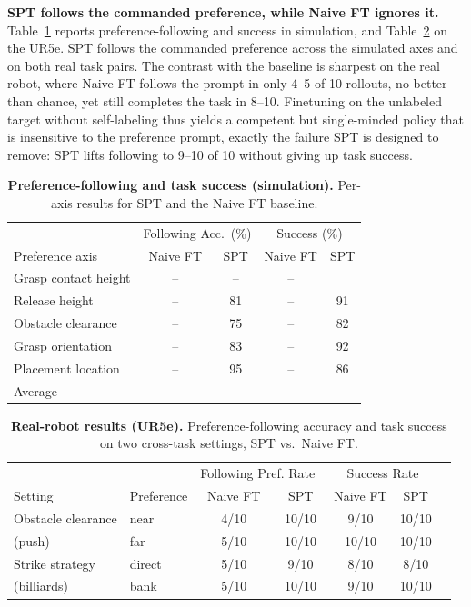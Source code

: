 \documentclass{article}
\begin{document}
\textbf{SPT follows the commanded preference, while Naive FT ignores it.}
Table~\ref{tab:sim_main} reports preference-following and success in simulation,
and Table~\ref{tab:real_main} on the UR5e. SPT follows the commanded preference
across the simulated axes and on both real task pairs. The contrast with the
baseline is sharpest on the real robot, where Naive FT follows the prompt in only
4--5 of 10 rollouts, no better than chance, yet still completes the task in 8--10.
Finetuning on the unlabeled target without self-labeling thus yields a competent
but single-minded policy that is insensitive to the preference prompt, exactly the
failure SPT is designed to remove: SPT lifts following to 9--10 of 10 without
giving up task success. 

\begin{table}[t]
  \centering
  \small
  \caption{\textbf{Preference-following and task success (simulation).} Per-axis
  results for SPT and the Naive FT baseline.}
  \label{tab:sim_main}
  \begin{tabular}{lcccc}
    \hline
    & \multicolumn{2}{c}{Following Acc.\ (\%)} & \multicolumn{2}{c}{Success (\%)} \\
    Preference axis & Naive FT & SPT & Naive FT & SPT \\
    \hline
    Grasp contact height & -- & -- & -- &  \\
    Release height       & -- & 81 & -- & 91 \\
    Obstacle clearance   & -- & 75 & -- & 82 \\
    Grasp orientation    & -- & 83 & -- & 92 \\
    Placement location   & -- & 95 & -- & 86 \\
    \hline
    Average              & -- & \textbf{--} & -- & -- \\
    \hline
  \end{tabular}
\end{table}

\begin{table}[t]
  \centering
  \small
  \caption{\textbf{Real-robot results (UR5e).} Preference-following accuracy and
  task success on two cross-task settings, SPT vs.\ Naive FT. }
  \label{tab:real_main}
  \begin{tabular}{llccccc}
    \hline
    & & \multicolumn{2}{c}{Following Pref. Rate\ } & \multicolumn{2}{c}{Success Rate} \\
    Setting & Preference & Naive FT & SPT & Naive FT & SPT \\
    \hline
    Obstacle clearance & near    & 4/10 & 10/10 & 9/10 & 10/10 \\
    (push)             & far     & 5/10 & 10/10 & 10/10 & 10/10 \\
    Strike strategy    & direct  & 5/10 & 9/10 & 8/10 & 8/10 \\
    (billiards)        & bank    & 5/10 & 10/10 & 9/10 & 10/10 \\
    \hline
  \end{tabular}
\end{table}
\end{document}
